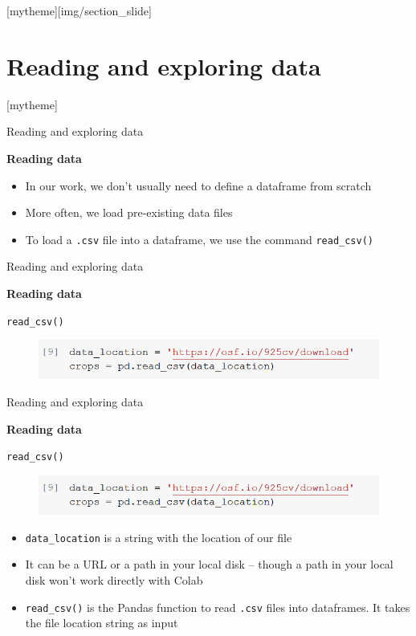 \documentclass[aspectratio=169]{beamer}
\newcommand{\sectionpic}[2]{
	\setbeamertemplate{section page}[mytheme][#2]
	\section{#1}
	\setbeamertemplate{section page}[mytheme]
}
\begin{document}
\sectionpic{Reading and exploring data}{img/section_slide}


\begin{frame}{Reading and exploring data}

	\textbf{Reading data}

	\begin{itemize}
		\item In our work, we don't usually need to define a dataframe from scratch
		\item More often, we load pre-existing data files
		\item To load a \texttt{.csv} file into a dataframe, we use the command \texttt{read\_csv()}
	\end{itemize}

\end{frame}

\begin{frame}{Reading and exploring data}

	\textbf{Reading data}

	\texttt{read\_csv()}

	\begin{figure}
		\centering
		\includegraphics[width=0.9\linewidth]{img/read_csv.png}
	\end{figure}

\end{frame}

\begin{frame}{Reading and exploring data}

	\textbf{Reading data}

	\texttt{read\_csv()}

	\begin{figure}
		\centering
		\includegraphics[width=0.9\linewidth]{img/read_csv.png}
	\end{figure}
	\begin{itemize}
		\item \texttt{data\_location} is a string with the location of our file
		\item It can be a URL or a path in your local disk -- though a path in your local disk won't work directly with Colab
		\item \texttt{read\_csv()} is the Pandas function to read \texttt{.csv} files into dataframes. It takes the file location string as input
	\end{itemize}

\end{frame}
\end{document}
